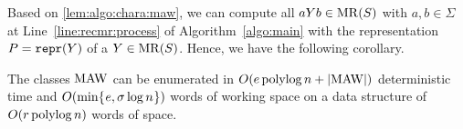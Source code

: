 Based on \cref{lem:algo:chara:maw}, we can compute all $aYb \in \mathrm{MR}(S)$ with $a,b \in \Sigma$ at Line~\ref{line:recmr:process} of Algorithm~\ref{algo:main} with 
the representation $P = \mathtt{repr}(Y)$ of a $Y \in \mathrm{MR}(S)$. Hence, we have the following corollary. 

\begin{corollary}\label{thm:algo:maw}
The classes $\mathrm{MAW}$ can be enumerated  in $O(e\operatorname{\mathrm{polylog}} n + |\mathrm{MAW}|)$ deterministic time and $O(\min\{\kern0.05eme,\sigma\log n\kern0.05em\})$ words of working space on a data structure of 
$O(r\operatorname{\mathrm{polylog}} n)$
words of space. 
\end{corollary}








